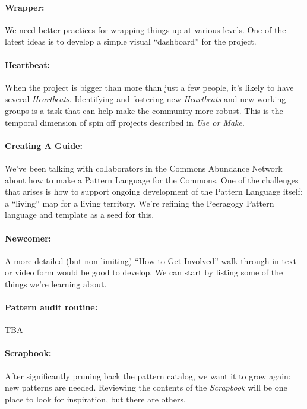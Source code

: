 \paragraph{Wrapper:}  We need better practices for wrapping things up at
various levels.  One of the latest ideas is to develop a simple visual
``dashboard'' for the project.

\paragraph{Heartbeat:} When the project is bigger than more than just a few people, it's likely to have several \emph{Heartbeats}.  Identifying and fostering new \emph{Heartbeats} and new working groups is a task that can help make the community more robust.  This is the temporal dimension of spin off projects described in \emph{Use or Make}.

\paragraph{Creating A Guide:} We’ve been talking with collaborators in the Commons Abundance Network
about how to make a Pattern Language for the Commons. One of the
challenges that arises is how to support ongoing development of the
Pattern Language itself: a “living” map for a living territory. We’re
refining the Peeragogy Pattern language and template as a seed for this.

\paragraph{Newcomer:} A more detailed (but non-limiting) ``How to Get Involved'' walk-through in text or video form would be good to develop. We can start by listing some of the things we're learning about.

\paragraph{Pattern audit routine:}  TBA

\paragraph{Scrapbook:} After significantly pruning back the pattern catalog, we want it to grow again: new patterns are needed.  Reviewing the contents of the \emph{Scrapbook} will be one place to look for inspiration, but there are others.



